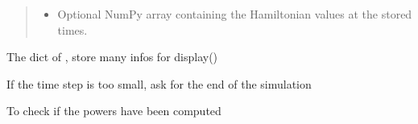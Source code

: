 \documentclass[letterpaper,10pt,english]{sphinxmanual}
\begin{document}
\begin{fulllineitems}
\begin{fulllineitems}
\begin{quote}
\begin{description}
\begin{itemize}
\item {} 
\sphinxAtStartPar
{} \textendash{} Optional NumPy array containing the Hamiltonian
values at the stored times.

\end{itemize}

\end{description}\end{quote}

\end{fulllineitems}


\begin{fulllineitems}
\label{\detokenize{scrimp:scrimp.dphs.DPHS.ports}}
\pysigstartsignatures
\pysigline
{}
\pysigstopsignatures
\sphinxAtStartPar
The dict of , store many infos for display()

\end{fulllineitems}


\begin{fulllineitems}
\label{\detokenize{scrimp:scrimp.dphs.DPHS.postevent}}
\pysigstartsignatures
\pysiglinewithargsret
{}
{\sphinxparamcomma {}\sphinxparamcomma {}\sphinxparamcomma {}\sphinxparamcomma {}}
{}
\pysigstopsignatures
\sphinxAtStartPar
If the time step is too small, ask for the end of the simulation

\end{fulllineitems}


\begin{fulllineitems}
\label{\detokenize{scrimp:scrimp.dphs.DPHS.powers_computed}}
\pysigstartsignatures
\pysigline
{}
\pysigstopsignatures
\sphinxAtStartPar
To check if the powers have been computed

\end{fulllineitems}


\end{fulllineitems}
\end{document}

